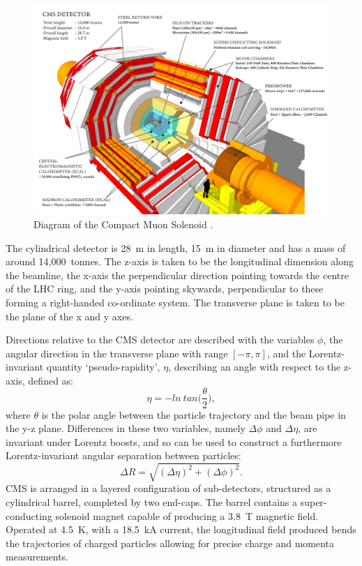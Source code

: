 \begin{figure}
  \centering
  \includegraphics[width=\textwidth]{Figs/machine/cms_120918_02.png}
  \caption{Diagram of the Compact Muon Solenoid
  \cite{Sakuma:2013jqa}.}
  \label{fig:cms_diagram}
\end{figure}

The cylindrical detector is 28~m in length, 15~m in diameter and has a mass of 
around 14,000~tonnes. 
The z-axis is taken to be the longitudinal dimension along the beamline, the
x-axis the perpendicular direction pointing towards the centre of the LHC ring, 
and the y-axis pointing skywards, perpendicular to these forming a right-handed 
co-ordinate system. The transverse plane is taken to be the plane of the x and y
axes.

Directions relative to the CMS detector are described with the variables $\phi$,
the angular direction in the transverse plane with range $[-\pi, \pi]$, and 
the Lorentz-invariant quantity `pseudo-rapidity', $\eta$, describing an angle
with respect to the z-axis, defined as:
% 
\begin{equation}
\eta = - ln \ tan \Bigg( \frac{\theta}{2} \Bigg) ,
\end{equation}
% 
where $\theta$ is the polar angle between the particle trajectory and the beam
pipe in the y-z plane.
Differences in these two variables, namely $\Delta \phi$ and $\Delta 
\eta$, are invariant under Lorentz boosts, and so can be used to construct a 
furthermore Lorentz-invariant angular separation between particles:
% 
\begin{equation}
\Delta R = \sqrt{ (\Delta \eta)^2 + (\Delta \phi)^2}.
\end{equation}
% 
CMS is arranged in a layered configuration of sub-detectors, structured as a 
cylindrical barrel, completed by two end-caps. The barrel contains a
super-conducting solenoid magnet capable of producing a 3.8~T magnetic field. 
Operated at 4.5~K, with a 18.5~kA current, the longitudinal field produced bends
the trajectories of charged particles allowing for precise charge and momenta 
measurements.

